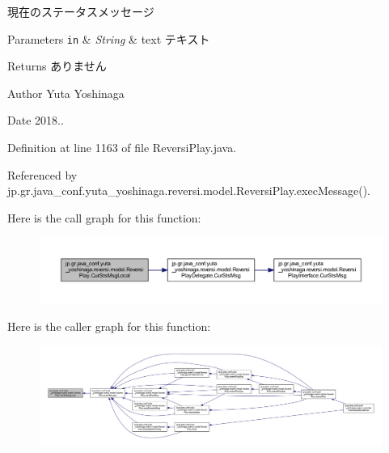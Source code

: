 現在のステータスメッセージ 


\begin{DoxyParams}[1]{Parameters}
\mbox{\tt in}  & {\em String} & text テキスト \\
\hline
\end{DoxyParams}
\begin{DoxyReturn}{Returns}
ありません 
\end{DoxyReturn}
\begin{DoxyAuthor}{Author}
Yuta Yoshinaga 
\end{DoxyAuthor}
\begin{DoxyDate}{Date}
2018.. 
\end{DoxyDate}


Definition at line 1163 of file Reversi\+Play.\+java.



Referenced by jp.\+gr.\+java\+\_\+conf.\+yuta\+\_\+yoshinaga.\+reversi.\+model.\+Reversi\+Play.\+exec\+Message().

Here is the call graph for this function\+:
\nopagebreak
\begin{figure}[H]
\begin{center}
\leavevmode
\includegraphics[width=350pt]{classjp_1_1gr_1_1java__conf_1_1yuta__yoshinaga_1_1reversi_1_1model_1_1_reversi_play_a4c4d14ddaf65d3643bd7edc7b562f4d1_cgraph}
\end{center}
\end{figure}
Here is the caller graph for this function\+:
\nopagebreak
\begin{figure}[H]
\begin{center}
\leavevmode
\includegraphics[width=350pt]{classjp_1_1gr_1_1java__conf_1_1yuta__yoshinaga_1_1reversi_1_1model_1_1_reversi_play_a4c4d14ddaf65d3643bd7edc7b562f4d1_icgraph}
\end{center}
\end{figure}
\mbox{\label{classjp_1_1gr_1_1java__conf_1_1yuta__yoshinaga_1_1reversi_1_1model_1_1_reversi_play_a0218c589d8567d52f92ab87bc4bec30f}} 
